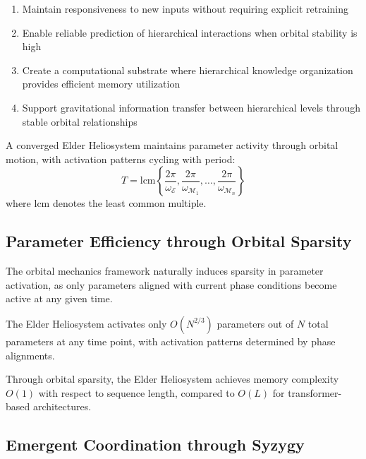 \begin{enumerate}
    \item Maintain responsiveness to new inputs without requiring explicit retraining
    \item Enable reliable prediction of hierarchical interactions when orbital stability is high
    \item Create a computational substrate where hierarchical knowledge organization provides efficient memory utilization
    \item Support gravitational information transfer between hierarchical levels through stable orbital relationships
\end{enumerate}

\begin{theorem}
A converged Elder Heliosystem maintains parameter activity through orbital motion, with activation patterns cycling with period:
\begin{equation}
T = \text{lcm}\left\{\frac{2\pi}{\omega_{\mathcal{E}}}, \frac{2\pi}{\omega_{\mathcal{M}_1}}, \ldots, \frac{2\pi}{\omega_{\mathcal{M}_n}}\right\}
\end{equation}
where $\text{lcm}$ denotes the least common multiple.
\end{theorem}

\subsection{Parameter Efficiency through Orbital Sparsity}

The orbital mechanics framework naturally induces sparsity in parameter activation, as only parameters aligned with current phase conditions become active at any given time.

\begin{proposition}
The Elder Heliosystem activates only $O(N^{2/3})$ parameters out of $N$ total parameters at any time point, with activation patterns determined by phase alignments.
\end{proposition}

\begin{corollary}
Through orbital sparsity, the Elder Heliosystem achieves memory complexity $O(1)$ with respect to sequence length, compared to $O(L)$ for transformer-based architectures.
\end{corollary}

\subsection{Emergent Coordination through Syzygy}

